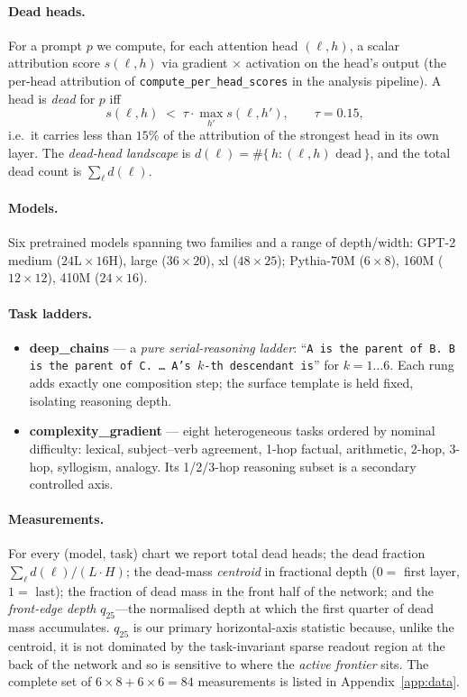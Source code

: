 \documentclass[11pt]{article}
\newcommand{\dl}{d(\ell)}
\begin{document}
\paragraph{Dead heads.}
For a prompt $p$ we compute, for each attention head $(\ell,h)$, a scalar
attribution score $s(\ell,h)$ via gradient$\,\times\,$activation on the head's
output (the per-head attribution of \texttt{compute\_per\_head\_scores} in the
analysis pipeline). A head is \emph{dead} for $p$ iff
\[
s(\ell,h) \;<\; \tau \cdot \max_{h'} s(\ell,h'), \qquad \tau = 0.15,
\]
i.e.\ it carries less than $15\%$ of the attribution of the strongest head in
its own layer. The \emph{dead-head landscape} is
$\dl = \#\{\,h : (\ell,h)\text{ dead}\,\}$, and the total dead count is
$\sum_\ell \dl$.

\paragraph{Models.}
Six pretrained models spanning two families and a range of depth/width:
GPT-2 medium ($24\text{L}\times16\text{H}$), large ($36\times20$), xl
($48\times25$); Pythia-70M ($6\times8$), 160M ($12\times12$), 410M
($24\times16$).

\paragraph{Task ladders.}
\begin{itemize}[leftmargin=1.4em,itemsep=2pt]
\item \textbf{deep\_chains} --- a \emph{pure serial-reasoning ladder}:
``\texttt{A is the parent of B. B is the parent of C.\ \ldots\ A's $k$-th
descendant is}'' for $k=1\ldots6$. Each rung adds exactly one composition
step; the surface template is held fixed, isolating reasoning depth.
\item \textbf{complexity\_gradient} --- eight heterogeneous tasks ordered by
nominal difficulty: lexical, subject--verb agreement, 1-hop factual,
arithmetic, 2-hop, 3-hop, syllogism, analogy. Its 1/2/3-hop reasoning subset
is a secondary controlled axis.
\end{itemize}

\paragraph{Measurements.}
For every (model, task) chart we report total dead heads; the dead fraction
$\sum_\ell\dl / (L\cdot H)$; the dead-mass \emph{centroid} in fractional depth
($0=$ first layer, $1=$ last); the fraction of dead mass in the front half of
the network; and the \emph{front-edge depth} $q_{25}$---the normalised depth
at which the first quarter of dead mass accumulates. $q_{25}$ is our primary
horizontal-axis statistic because, unlike the centroid, it is not dominated by
the task-invariant sparse readout region at the back of the network and so is
sensitive to where the \emph{active frontier} sits. The complete set of
$6\times8 + 6\times6 = 84$ measurements is listed in Appendix~\ref{app:data}.
\end{document}
